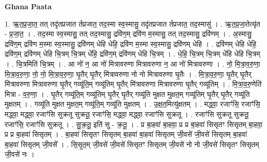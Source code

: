 \documentclass[17pt]{extarticle}
\begin{document}
\textbf{Ghana Paata } \newline

1. ऋ॒त॒प्र॒जा॒त॒ तत् तदृ॑तप्रजात र्तप्रजात॒ तद॒स्मा स्व॒स्मासु॒ तदृ॑तप्रजात र्तप्रजात॒ तद॒स्मासु॑ । . ऋ॒त॒प्र॒जा॒तेत्यृ॑त - प्र॒जा॒त॒ । . तद॒स्मा स्व॒स्मासु॒ तत् तद॒स्मासु॒ द्रवि॑ण॒म् द्रवि॑ण म॒स्मासु॒ तत् तद॒स्मासु॒ द्रवि॑णम् । . अ॒स्मासु॒ द्रवि॑ण॒म् द्रवि॑ण म॒स्मा स्व॒स्मासु॒ द्रवि॑णम् धेहि धेहि॒ द्रवि॑ण म॒स्मा स्व॒स्मासु॒ द्रवि॑णम् धेहि । . द्रवि॑णम् धेहि धेहि॒ द्रवि॑ण॒म् द्रवि॑णम् धेहि चि॒त्रम् चि॒त्रम् धे॑हि॒ द्रवि॑ण॒म् द्रवि॑णम् धेहि चि॒त्रम् । . धे॒हि॒ चि॒त्रम् चि॒त्रम् धे॑हि धेहि चि॒त्रम् । . चि॒त्रमिति॑ चि॒त्रम् । . आ नो॑ न॒ आ नो॑ मित्रावरुणा मित्रावरुणा न॒ आ नो॑ मित्रावरुणा । . नो॒ मि॒त्रा॒व॒रु॒णा॒ मि॒त्रा॒व॒रु॒णा॒ नो॒ नो॒ मि॒त्रा॒व॒रु॒णा॒ घृ॒तैर् घृ॒तैर् मि॑त्रावरुणा नो नो मित्रावरुणा घृ॒तैः । . मि॒त्रा॒व॒रु॒णा॒ घृ॒तैर् घृ॒तैर् मि॑त्रावरुणा मित्रावरुणा घृ॒तैर् गव्यू॑ति॒म् गव्यू॑तिम् घृ॒तैर् मि॑त्रावरुणा मित्रावरुणा घृ॒तैर् गव्यू॑तिम् । . मि॒त्रा॒व॒रु॒णेति॑ मित्रा - व॒रु॒णा॒ । . घृ॒तैर् गव्यू॑ति॒म् गव्यू॑तिम् घृ॒तैर् घृ॒तैर् गव्यू॑ति मुक्षत मुक्षत॒म् गव्यू॑तिम् घृ॒तैर् घृ॒तैर् गव्यू॑ति मुक्षतम् । . गव्यू॑ति मुक्षत मुक्षत॒म् गव्यू॑ति॒म् गव्यू॑ति मुक्षतम् । . उ॒क्ष॒त॒मित्यु॑क्षतम् । . मद्ध्वा॒ रजाꣳ॑सि॒ रजाꣳ॑सि॒ मद्ध्वा॒ मद्ध्वा॒ रजाꣳ॑सि सुक्रतू सुक्रतू॒ रजाꣳ॑सि॒ मद्ध्वा॒ मद्ध्वा॒ रजाꣳ॑सि सुक्रतू । . रजाꣳ॑सि सुक्रतू सुक्रतू॒ रजाꣳ॑सि॒ रजाꣳ॑सि सुक्रतू । . सु॒क्र॒तू॒ इति॑ सु - क्र॒तू॒ । . प्र बा॒हवा॑ बा॒हवा॒ प्र प्र बा॒हवा॑ सिसृतꣳ सिसृतम् बा॒हवा॒ प्र प्र बा॒हवा॑ सिसृतम् । . बा॒हवा॑ सिसृतꣳ सिसृतम् बा॒हवा॑ बा॒हवा॑ सिसृतम् जी॒वसे॑ जी॒वसे॑ सिसृतम् बा॒हवा॑ बा॒हवा॑ सिसृतम् जी॒वसे᳚ । . सि॒सृ॒त॒म् जी॒वसे॑ जी॒वसे॑ सिसृतꣳ सिसृतम् जी॒वसे॑ नो नो जी॒वसे॑ सिसृतꣳ सिसृतम् जी॒वसे॑ नः । \newline
\end{document}
